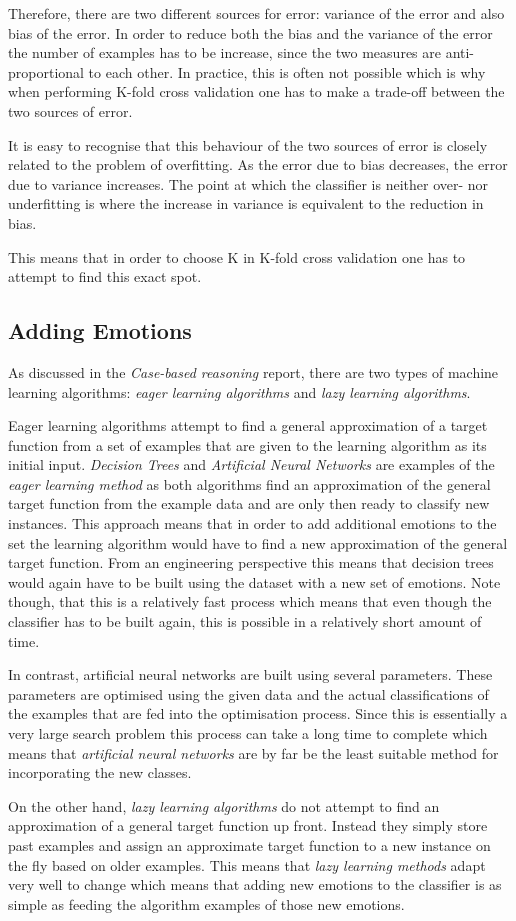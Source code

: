 \documentclass[10pt,a4paper]{article}
\begin{document}
Therefore, there are two different sources for error: variance of the error and also bias of the error. In order to reduce both the bias and the variance of the error the number of examples has to be increase, since the two measures are anti-proportional to each other. In practice, this is often not possible which is why when performing K-fold cross validation one has to make a trade-off between the two sources of error. 

It is easy to recognise that this behaviour of the two sources of error is closely related to the problem of overfitting. As the error due to bias decreases, the error due to variance increases. The point at which the classifier is neither over- nor underfitting is where the increase in variance is equivalent to the reduction in bias.

This means that in order to choose K in K-fold cross validation one has to attempt to find this exact spot.

\subsection{Adding Emotions}
As discussed in the \emph{Case-based reasoning} report, there are two types of machine learning algorithms: \emph{eager learning algorithms} and \emph{lazy learning algorithms}. 

Eager learning algorithms attempt to find a general approximation of a target function from a set of examples that are given to the learning algorithm as its initial input. \emph{Decision Trees} and \emph{Artificial Neural Networks} are examples of the \emph{eager learning method} as both algorithms find an approximation of the general target function from the example data and are only then ready to classify new instances. This approach means that in order to add additional emotions to the set the learning algorithm would have to find a new approximation of the general target function. From an engineering perspective this means that decision trees would again have to be built using the dataset with a new set of emotions. Note though, that this is a relatively fast process which means that even though the classifier has to be built again, this is possible in a relatively short amount of time.

In contrast, artificial neural networks are built using several parameters. These parameters are optimised using the given data and the actual classifications of the examples that are fed into the optimisation process. Since this is essentially a very large search problem this process can take a long time to complete which means that \emph{artificial neural networks} are by far be the least suitable method for incorporating the new classes.

On the other hand, \emph{lazy learning algorithms} do not attempt to find an approximation of a general target function up front. Instead they simply store past examples and assign an approximate target function to a new instance on the fly based on older examples. This means that \emph{lazy learning methods} adapt very well to change which means that adding new emotions to the classifier is as simple as feeding the algorithm examples of those new emotions.



\end{document}
